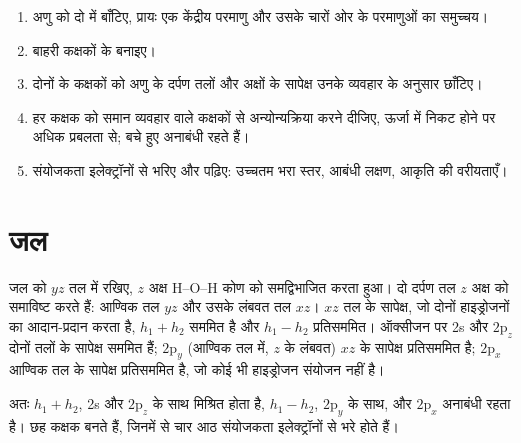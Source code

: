 \begin{method}[अणुखंड आरेख]\label{met:b2:fragment-orbitals:fragment-diagram}
\begin{enumerate}
  \item अणु को दो  में बाँटिए, प्रायः एक केंद्रीय परमाणु और उसके चारों ओर के
        परमाणुओं का समुच्चय।
  \item बाहरी कक्षकों के  बनाइए।
  \item दोनों  के कक्षकों को अणु के दर्पण तलों और अक्षों के
        सापेक्ष उनके व्यवहार के अनुसार छाँटिए।
  \item हर कक्षक को समान व्यवहार वाले कक्षकों से अन्योन्यक्रिया करने दीजिए, ऊर्जा में
        निकट होने पर अधिक प्रबलता से; बचे हुए अनाबंधी रहते हैं।
  \item संयोजकता इलेक्ट्रॉनों से भरिए और पढ़िए: उच्चतम भरा स्तर,
        आबंधी लक्षण, आकृति की वरीयताएँ।
\end{enumerate}
\end{method}

\section{जल}

जल को $yz$ तल में रखिए, $z$ अक्ष H--O--H कोण को समद्विभाजित करता हुआ। दो
दर्पण तल $z$ अक्ष को समाविष्ट करते हैं: आण्विक तल $yz$ और उसके लंबवत
तल $xz$। $xz$ तल के सापेक्ष, जो दोनों हाइड्रोजनों का आदान-प्रदान
करता है, $h_1 + h_2$ सममित है और $h_1 - h_2$ प्रतिसममित। ऑक्सीजन पर 2s और
$2\mathrm p_z$ दोनों तलों के सापेक्ष सममित हैं; $2\mathrm p_y$ (आण्विक
तल में, $z$ के लंबवत) $xz$ के सापेक्ष प्रतिसममित है;
$2\mathrm p_x$ आण्विक तल के सापेक्ष प्रतिसममित है, जो कोई भी
हाइड्रोजन संयोजन नहीं है।

अतः $h_1 + h_2$, 2s और $2\mathrm p_z$ के साथ मिश्रित होता है, $h_1 - h_2$, $2\mathrm p_y$ के साथ, और
$2\mathrm p_x$ अनाबंधी रहता है। छह कक्षक बनते हैं, जिनमें से चार आठ
संयोजकता इलेक्ट्रॉनों से भरे होते हैं।

